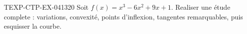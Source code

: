 \begin{exercice}{TEXP-CTP-EX-041}{3}{20}
Soit $f(x) = x^3 - 6x^2 + 9x + 1$. Realiser une étude complete : variations, convexité, points d'inflexion, tangentes remarquables, puis esquisser la courbe.

\end{exercice}
